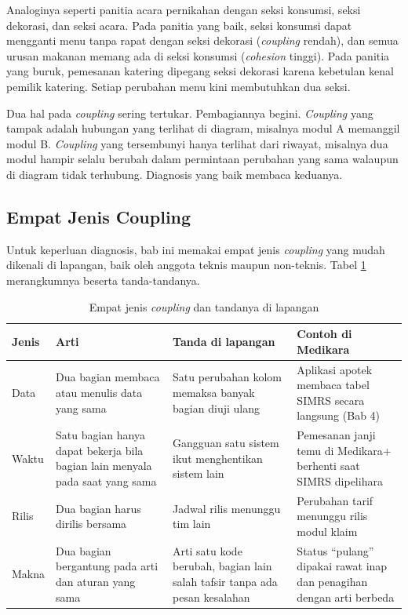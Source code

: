Analoginya seperti panitia acara pernikahan dengan seksi konsumsi, seksi dekorasi, dan seksi acara.
Pada panitia yang baik, seksi konsumsi dapat mengganti menu tanpa rapat dengan seksi dekorasi
(\textit{coupling} rendah), dan semua urusan makanan memang ada di seksi konsumsi (\textit{cohesion}
tinggi). Pada panitia yang buruk, pemesanan katering dipegang seksi dekorasi karena kebetulan kenal
pemilik katering. Setiap perubahan menu kini membutuhkan dua seksi.

Dua hal pada \textit{coupling} sering tertukar. Pembagiannya begini. \textit{Coupling} yang tampak
adalah hubungan yang terlihat di diagram, misalnya modul A memanggil modul B. \textit{Coupling} yang
tersembunyi hanya terlihat dari riwayat, misalnya dua modul hampir selalu berubah dalam permintaan
perubahan yang sama walaupun di diagram tidak terhubung. Diagnosis yang baik membaca keduanya.

\subsection{Empat Jenis Coupling}

Untuk keperluan diagnosis, bab ini memakai empat jenis \textit{coupling} yang mudah dikenali di
lapangan, baik oleh anggota teknis maupun non-teknis. Tabel \ref{tab:ch07-jenis-coupling}
merangkumnya beserta tanda-tandanya.

\begin{table}[!htb]
  \centering
  \caption{Empat jenis \textit{coupling} dan tandanya di lapangan}
  \label{tab:ch07-jenis-coupling}
  \footnotesize
  \begin{tabularx}{\textwidth}{>{\raggedright\arraybackslash}p{1.7cm} >{\raggedright\arraybackslash}X >{\raggedright\arraybackslash}X >{\raggedright\arraybackslash}X}
    \hline
    \textbf{Jenis} & \textbf{Arti} & \textbf{Tanda di lapangan} & \textbf{Contoh di Medikara} \\
      \hline
    Data & Dua bagian membaca atau menulis data yang sama & Satu perubahan kolom memaksa banyak
      bagian diuji ulang & Aplikasi apotek membaca tabel SIMRS secara langsung (Bab 4) \\ \hline
    Waktu & Satu bagian hanya dapat bekerja bila bagian lain menyala pada saat yang sama & Gangguan
      satu sistem ikut menghentikan sistem lain & Pemesanan janji temu di Medikara+ berhenti saat
      SIMRS dipelihara \\ \hline
    Rilis & Dua bagian harus dirilis bersama & Jadwal rilis menunggu tim lain & Perubahan tarif
      menunggu rilis modul klaim \\ \hline
    Makna & Dua bagian bergantung pada arti dan aturan yang sama & Arti satu kode berubah, bagian
      lain salah tafsir tanpa ada pesan kesalahan & Status ``pulang'' dipakai rawat inap dan
      penagihan dengan arti berbeda \\ \hline
  \end{tabularx}
\end{table}

